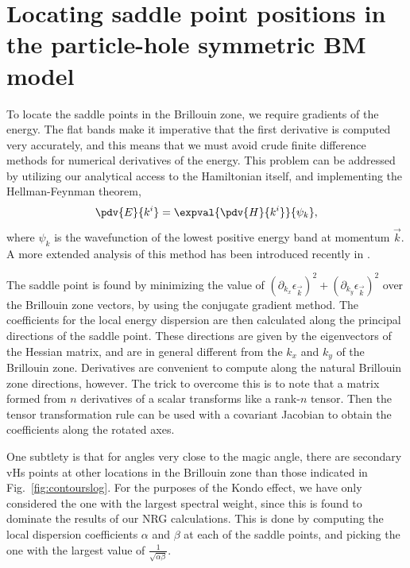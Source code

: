 
\appendix

\section{Locating saddle point positions in the particle-hole symmetric BM model}

To locate the saddle points in the Brillouin  zone, we require gradients of the energy. The flat bands make it imperative that the first derivative is computed very accurately, and this means that we must avoid crude finite difference methods for numerical derivatives of the energy. This problem can be addressed by utilizing our analytical access to the Hamiltonian itself, and implementing the Hellman-Feynman theorem,
\begin{equation}
	\pdv{E}{k^i} = \expval{\pdv{H}{k^i}}{\psi_k}, 
\end{equation}
where $\psi_k$ is the wavefunction of the lowest positive energy band at momentum $\vec{k}$. A more extended analysis of this method has been introduced recently in \cite{chandrasekaran2022detect}.

The saddle point is found by minimizing the value of $\left(\partial_{k_x} \epsilon_\vec{k}\right)^2 + \left(\partial_{k_y} \epsilon_\vec{k}\right)^2$ over the Brillouin  zone vectors, by using the conjugate gradient method.
The coefficients for the local energy dispersion are then calculated along the principal directions of the saddle point. These directions are given by the eigenvectors of the Hessian matrix, and are in general different from the $k_x$ and $k_y$ of the Brillouin  zone. Derivatives are convenient to compute along the natural Brillouin  zone directions, however. The trick to overcome this is to note that a matrix formed from $n$ derivatives of a scalar transforms like a rank-$n$ tensor. Then the tensor transformation rule can be used with a covariant Jacobian to obtain the coefficients along the rotated axes. 

One subtlety is that for angles very close to the magic angle, there are secondary vHs points at other locations in the Brillouin zone than those indicated in Fig.~\ref{fig:contourslog}. For the purposes of the Kondo effect, we have only considered the one with the largest spectral weight, since this is found to dominate the results of our NRG calculations. This is done by computing the local dispersion coefficients $\alpha$ and $\beta$ at each of the saddle points, and picking the one with the largest value of $\frac{1}{\sqrt{\alpha\beta}}$. 

